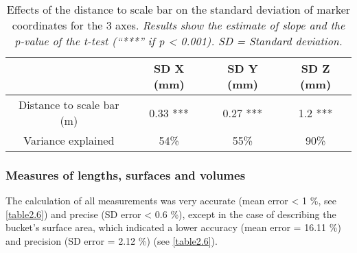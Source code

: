 \begin{table}[htbp]
  \centering
  \normalsize
  \caption[Effects of the distance to scale bar on the standard deviation of marker coordinates for the 3 axes.]{Effects of the distance to scale bar on the standard deviation of marker coordinates for the 3 axes. \textit{Results show the estimate of slope and the p-value of the t-test (“***” if p < 0.001). SD = Standard deviation.}}
  \label{table2.5}
    \begin{tabular}{*{4}{c}}
\toprule
                          & \textbf{SD X (mm)} & \textbf{SD Y (mm)} & \textbf{SD Z (mm)} \\ \midrule
Distance to scale bar (m) & 0.33 ***           & 0.27 ***           & 1.2 ***            \\
Variance explained        & 54\%               & 55\%               & 90\%               \\ \bottomrule
\end{tabular}
\end{table}

\subsubsection{Measures of lengths, surfaces and volumes}\label{chapitre2_3.2.2}
The calculation of all measurements was very accurate (mean error < 1 \%, see \autoref{table2.6}) and precise (SD error < 0.6 \%), except in the case of describing the bucket’s surface area, which indicated a lower accuracy (mean error = 16.11 \%) and precision (SD error = 2.12 \%) (see \autoref{table2.6}).

